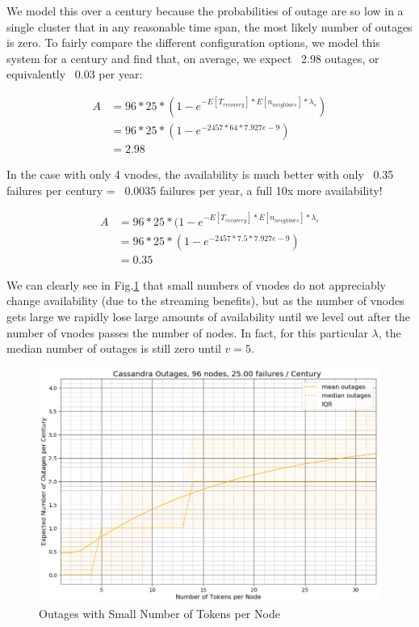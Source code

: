\documentclass{article}
\begin{document}
We model this over a century because the probabilities of outage are so low in a
single cluster that in any reasonable time span, the most likely number of outages
is zero. To fairly compare the different configuration options, we model this
system for a century and find that, on average, we expect ~2.98 outages, or
equivalently ~0.03 per year:

\begin{equation}
    \begin{split}
    A & = 96 * 25 * (1 - e^{-E[T_{recovery}] * E[n_{neighbors}] * \lambda_{s}}) \\
    & = 96 * 25 * (1 - e^{-2457 * 64 * 7.927e-9}) \\
    & = 2.98
    \end{split}
\end{equation}

In the case with only 4 vnodes, the availability is much better with
only ~0.35 failures per century = ~0.0035 failures per year, a full 10x more
availability!

\begin{equation}
    \begin{split}
    A & = 96 * 25 * (1 - e^{-E[T_{recovery}] * E[n_{neighbors}] * \lambda_{s}} \\
    & = 96 * 25 * (1 - e^{-2457 * 7.5 * 7.927e-9}) \\
    & = 0.35
    \end{split}
\end{equation}


We can clearly see in Fig.\ref{fig:outages_small_vnodes} that small numbers of
vnodes do not appreciably change availability (due to the streaming benefits),
but as the number of vnodes gets large we rapidly lose large amounts of
availability until we level out after the number of vnodes passes the number of
nodes. In fact, for this particular $\lambda$, the median number of outages is
still zero until $v=5$.

\begin{figure}[h!]
    \centering
    \includegraphics[width=1.0\textwidth]{images/outages_vnodes_small.png}
    \caption{Outages with Small Number of Tokens per Node}
    \label{fig:outages_small_vnodes}
\end{figure}
\end{document}
